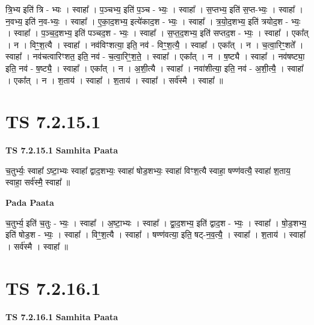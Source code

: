 \documentclass[17pt]{extarticle}
\begin{document}
त्रि॒भ्य इति॑ त्रि - भ्यः । स्वाहा᳚ । प॒ञ्चभ्य॒ इति॑ प॒ञ्च - भ्यः॒ । स्वाहा᳚ । स॒प्तभ्य॒ इति॑ स॒प्त-भ्यः॒ । स्वाहा᳚ । न॒वभ्य॒ इति॑ न॒व-भ्यः॒ । स्वाहा᳚ । ए॒का॒द॒शभ्य॒ इत्ये॑काद॒श - भ्यः॒ । स्वाहा᳚ । त्र॒यो॒द॒शभ्य॒ इति॑ त्रयोद॒श - भ्यः॒ । स्वाहा᳚ । प॒ञ्च॒द॒शभ्य॒ इति॑ पञ्चद॒श - भ्यः॒ । स्वाहा᳚ । स॒प्त॒द॒शभ्य॒ इति॑ सप्तद॒श - भ्यः॒ । स्वाहा᳚ । एका᳚त् । न । विꣳ॒॒श॒त्यै । स्वाहा᳚ । नव॑विꣳशत्या॒ इति॒ नव॑ - विꣳ॒॒श॒त्यै॒ । स्वाहा᳚ । एका᳚त् । न । च॒त्वा॒रिꣳ॒॒शते᳚ । स्वाहा᳚ । नव॑चत्वारिꣳशत॒ इति॒ नव॑ - च॒त्वा॒रिꣳ॒॒श॒ते॒ । स्वाहा᳚ । एका᳚त् । न । ष॒ष्ट्यै । स्वाहा᳚ । नव॑षष्ट्या॒ इति॒ नव॑ - ष॒ष्ट्यै॒ । स्वाहा᳚ । एका᳚त् । न । अ॒शी॒त्यै । स्वाहा᳚ । नवा॑शीत्या॒ इति॒ नव॑ - अ॒शी॒त्यै॒ । स्वाहा᳚ । एका᳚त् । न । श॒ताय॑ । स्वाहा᳚ । श॒ताय॑ । स्वाहा᳚ । सर्व॑स्मै । स्वाहा᳚ ॥  \newline





\section{ TS 7.2.15.1 }

\textbf{TS 7.2.15.1 } \newline
\textbf{Samhita Paata} \newline

च॒तुर्भ्यः॒ स्वाहा᳚ ऽष्टा॒भ्यः स्वाहा᳚ द्वाद॒शभ्यः॒ स्वाहा॑ षोड॒शभ्यः॒ स्वाहा॑ विꣳश॒त्यै स्वाहा॒ षण्ण॑वत्यै॒ स्वाहा॑ श॒ताय॒ स्वाहा॒ सर्व॑स्मै॒ स्वाहा᳚ ॥ \newline

\textbf{Pada Paata} \newline

च॒तुर्भ्य॒ इति॑ च॒तुः - भ्यः॒ । स्वाहा᳚ । अ॒ष्टा॒भ्यः । स्वाहा᳚ । द्वा॒द॒शभ्य॒ इति॑ द्वाद॒श - भ्यः॒ । स्वाहा᳚ । षो॒ड॒शभ्य॒ इति॑ षोड॒श - भ्यः॒ । स्वाहा᳚ । विꣳ॒॒श॒त्यै । स्वाहा᳚ । षण्ण॑वत्या॒ इति॒ षट्-न॒व॒त्यै॒ । स्वाहा᳚ । श॒ताय॑ । स्वाहा᳚ । सर्व॑स्मै । स्वाहा᳚ ॥  \newline





\section{ TS 7.2.16.1 }

\textbf{TS 7.2.16.1 } \newline
\textbf{Samhita Paata} \newline
\end{document}
